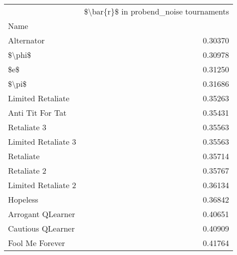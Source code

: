 \begin{tabular}{lr}
\toprule
{} &  \$\textbackslash bar\{r\}\$ in probend\_noise tournaments \\
Name                &                                         \\
\midrule
Alternator          &                                 0.30370 \\
\$\textbackslash phi\$              &                                 0.30978 \\
\$e\$                 &                                 0.31250 \\
\$\textbackslash pi\$               &                                 0.31686 \\
Limited Retaliate   &                                 0.35263 \\
Anti Tit For Tat    &                                 0.35431 \\
Retaliate 3         &                                 0.35563 \\
Limited Retaliate 3 &                                 0.35563 \\
Retaliate           &                                 0.35714 \\
Retaliate 2         &                                 0.35767 \\
Limited Retaliate 2 &                                 0.36134 \\
Hopeless            &                                 0.36842 \\
Arrogant QLearner   &                                 0.40651 \\
Cautious QLearner   &                                 0.40909 \\
Fool Me Forever     &                                 0.41764 \\
\bottomrule
\end{tabular}
